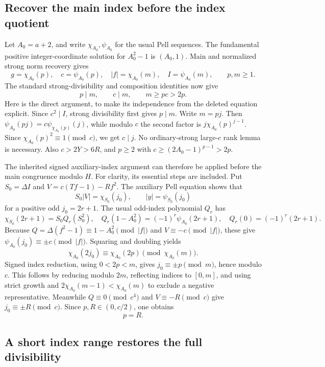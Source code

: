 \subsection{Recover the main index before the index quotient}

Let $A_0=a+2$, and write $\chi_{A_0},\psi_{A_0}$ for the usual Pell
sequences. The fundamental positive integer-coordinate solution for
$A_0^2-1$ is $(A_0,1)$. Main and normalized strong norm recovery gives
\[
 g=\chi_{A_0}(p),\quad c=\psi_{A_0}(p),\quad
 |f|=\chi_{A_0}(m),\quad I=\psi_{A_0}(m),\qquad p,m\ge1.
\]
The standard strong-divisibility and composition identities now give
\begin{equation}
 p\mid m,\qquad c\mid m,\qquad m\ge pc>2p.
 \label{eq:eleven-rank}
\end{equation}
Here is the direct argument, to make its independence from the deleted
equation explicit. Since $c^2\mid I$, strong divisibility first gives
$p\mid m$. Write $m=pj$. Then
$\psi_{A_0}(pj)=c\psi_{\chi_{A_0}(p)}(j)$, while modulo $c$ the
second factor is $j\chi_{A_0}(p)^{j-1}$. Since
$\chi_{A_0}(p)^2\equiv1\pmod c$, we get $c\mid j$. No ordinary-strong
large-$c$ rank lemma is necessary. Also $c>2Y>6R$, and $p\ge2$ with
$c\ge(2A_0-1)^{p-1}>2p$.

The inherited signed auxiliary-index argument can therefore be applied
before the main congruence modulo $H$. For clarity, its essential steps are
included. Put $S_0=\Delta I$ and $V=c(Tf-1)-Rf^2$. The auxiliary Pell
equation shows that
\[
 S_0|V|=\chi_{S_0}(j_0),\qquad |y|=\psi_{S_0}(j_0)
\]
for a positive odd $j_0=2r+1$. The usual odd-index polynomial $Q_r$ has
\[
 \chi_{S_0}(2r+1)=S_0Q_r(S_0^2),\quad
 Q_r(1-A_0^2)=(-1)^r\psi_{A_0}(2r+1),\quad
 Q_r(0)=(-1)^r(2r+1).
\]
Because $Q=\Delta(f^2-1)\equiv1-A_0^2\pmod{|f|}$ and
$V\equiv-c\pmod{|f|}$, these give
$\psi_{A_0}(j_0)\equiv\pm c\pmod{|f|}$. Squaring and doubling yields
\[
 \chi_{A_0}(2j_0)\equiv\chi_{A_0}(2p)\pmod{\chi_{A_0}(m)}.
\]
Signed index reduction, using $0<2p<m$, gives $j_0\equiv\pm p\pmod m$,
hence modulo $c$. This follows by reducing modulo $2m$, reflecting indices
to $[0,m]$, and using strict growth and
$2\chi_{A_0}(m-1)<\chi_{A_0}(m)$ to exclude a negative representative.
Meanwhile $Q\equiv0\pmod{c^4}$ and $V\equiv-R\pmod c$ give
$j_0\equiv\pm R\pmod c$. Since $p,R\in(0,c/2)$, one obtains
\begin{equation}
 p=R.
 \label{eq:eleven-pR}
\end{equation}

\subsection{A short index range restores the full divisibility}

